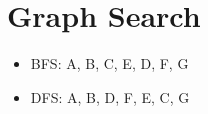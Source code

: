 \section{Graph Search}
\begin{itemize}
\item BFS: A, B, C, E, D, F, G
\item DFS: A, B, D, F, E, C, G
\end{itemize}